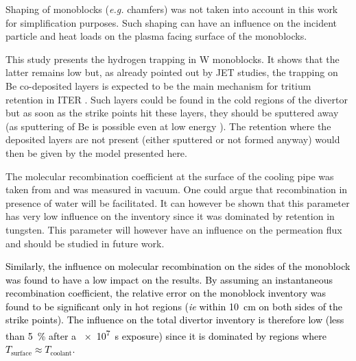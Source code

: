 Shaping of monoblocks (\textit{e.g.} chamfers) was not taken into account in this work for simplification purposes.
Such shaping can have an influence on the incident particle and heat loads on the plasma facing surface of the monoblocks.



This study presents the hydrogen trapping in W monoblocks.
It shows that the latter remains low but, as already pointed out by JET studies, the trapping on Be co-deposited layers is expected to be the main mechanism for tritium retention in ITER .
Such layers could be found in the cold regions of the divertor but as soon as the strike points hit these layers, they should be sputtered away (as sputtering of Be is possible even at low energy  \cite{brezinsek_beryllium_2015}).
The retention where the deposited layers are not present (either sputtered or not formed anyway) would then be given by the model presented here.

The molecular recombination coefficient at the surface of the cooling pipe was taken from  and was measured in vacuum.
One could argue that recombination in presence of water will be facilitated.
It can however be shown that this parameter has very low influence on the inventory since it was dominated by retention in tungsten.
This parameter will however have an influence on the permeation flux and should be studied in future work.

\textcolor{black}{Similarly, the influence on molecular recombination on the sides of the monoblock was found to have a low impact on the results.
By assuming an instantaneous recombination coefficient, the relative error on the monoblock inventory was found to be significant only in hot regions (\textit{ie} within \SI{10}{cm} on both sides of the strike points).
The influence on the total divertor inventory is therefore low (less than \SI{5}{\%} after a \SI{e7}{s} exposure) since it is dominated by regions where $T_\mathrm{surface} \approx T_\mathrm{coolant}$.}

